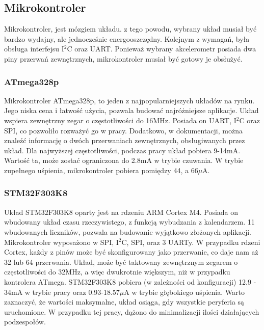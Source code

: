 \subsection{Mikrokontroler}
Mikrokontroler, jest mózgiem układu. z tego powodu, wybrany układ musiał być bardzo wydajny, ale jednocześnie energooszczędny. Kolejnym z wymagań, była obsługa interfejsu I$^{2}$C oraz UART. Ponieważ wybrany akcelerometr posiada dwa piny przerwań zewnętrznych, mikrokontroler musiał być gotowy je obsłużyć.

\subsubsection{ATmega328p}
Mikrokontroler ATmega328p, to jeden z najpopularniejszych układów na rynku. Jego niska cena i łatwość użycia, pozwala budować najróżniejsze aplikacje. Układ wspiera zewnętrzny zegar o częstotliwości do 16MHz. Posiada on UART, I$^{2}$C oraz SPI, co pozwoliło rozważyć go w pracy. Dodatkowo, w dokumentacji, można znaleźć informację o dwóch przerwaniach zewnętrznych, obsługiwanych przez układ.\cite{ATMEGA328P} Dla najwyższej częstotliwości, podczas pracy układ pobiera 9-14mA. Wartość ta, może zostać ograniczona do 2.8mA w trybie czuwania. W trybie zupełnego uśpienia, mikrokontroler pobiera pomiędzy 44, a 66$\mu$A.

\subsubsection{STM32F303K8}
Układ STM32F303K8 oparty jest na rdzeniu ARM Cortex M4. Posiada on wbudowany układ czasu rzeczywistego, z funkcją wybudzania z kalendarzem. 11 wbudowanych liczników, pozwala na budowanie wyjątkowo złożonych aplikacji. Mikrokontroler wyposażono w SPI, I$^{2}$C, SPI, oraz 3 UARTy. W przypadku rdzeni Cortex, każdy z pinów może być skonfigurowany jako przerwanie, co daje nam aż 32 lub 64 przerwania. \cite{STM32F303K8} Układ, może być taktowany zewnętrznym zegarem o częstotliwości do 32MHz, a więc dwukrotnie większym, niż w przypadku kontrolera ATmega. STM32F303K8 pobiera (w zależności od konfiguracji) 12.9 - 34mA w trybie pracy oraz 0.93-18.57$\mu$A w trybie głębokiego uśpienia. Warto zaznaczyć, że wartości maksymalne, układ osiąga, gdy wszystkie peryferia są uruchomione. W przypadku tej pracy, dążono do minimalizacji ilości działających podzespołów.

